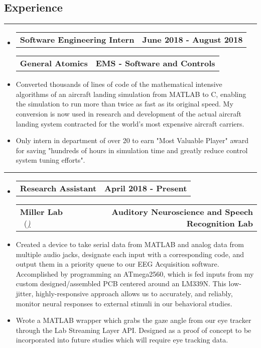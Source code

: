 \documentclass[10pt,letterpaper]{article}
\makeatletter
\newcommand{\items}[2]
{
	\begin{tabular*}{\linewidth}{l @{\extracolsep{\fill}} r}
		#1 & #2 \\
	\end{tabular*}
}
\newcommand{\sectionbreak}
{
	\vspace{-1.2em}
	\rule{\textwidth}{1.7pt}
	\vspace{-1.7em}
}
\makeatother
\begin{document}
\vspace{-1.5em}

\subsection*{Experience}
\sectionbreak

\begin{itemize}
	\item[]
		\items
			{\textbf{Software Engineering Intern}} 
			{\textbf{June 2018 - August 2018}}
		\items
			{\textbf{General Atomics}}
			{\textbf{EMS - Software and Controls}} 
		\item
			Converted thousands of lines of code of the mathematical intensive algorithms of an aircraft landing simulation from MATLAB to C, enabling the simulation to run more than twice as fast as its original speed. My conversion is now used in research and development of the actual aircraft landing system contracted for the world’s most expensive aircraft carriers.
		\item
			Only intern in department of over 20 to earn "Most Valuable Player" award for saving "hundreds of hours in simulation time and greatly reduce control system tuning efforts".

\end{itemize}

\hrule

\begin{itemize}
	\item[]
		\items
			{\textbf{Research Assistant}} 
			{\textbf{April 2018 - Present}}
		\items
		{\textbf{Miller Lab} \ (\href{https://millerlab.faculty.ucdavis.edu}{\small \emph{\underline{\smash{millerlab.faculty.ucdavis.edu})}}} }
			{\textbf{Auditory Neuroscience and Speech Recognition Lab}} 
		\item
			Created a device to take serial data from MATLAB and analog data from multiple audio jacks, designate each input with a corresponding code, and output them in a priority queue to our EEG Acquisition software. Accomplished by programming an ATmega2560, which is fed inputs from my custom designed/assembled PCB centered around an LM339N. This low-jitter, highly-responsive approach allows us to accurately, and reliably, monitor neural responses to external stimuli in our behavioral studies.
		\item 
			Wrote a MATLAB wrapper which grabs the gaze angle from our eye tracker through the Lab Streaming Layer API. Designed as a proof of concept to be incorporated into future studies which will require eye tracking data.
\end{itemize}
\end{document}

